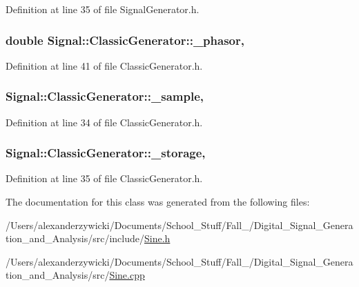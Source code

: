 Definition at line 35 of file Signal\+Generator.\+h.

\hypertarget{classSignal_1_1ClassicGenerator_ade9b66bc49d2d2f40a1390fc6374b8b2}{
\subsubsection[{\+\_\+phasor}]{\setlength{\rightskip}{0pt plus 5cm}double Signal\+::\+Classic\+Generator\+::\+\_\+phasor\hspace{0.3cm}{\ttfamily [protected]}, {\ttfamily [inherited]}}}\label{classSignal_1_1ClassicGenerator_ade9b66bc49d2d2f40a1390fc6374b8b2}


Definition at line 41 of file Classic\+Generator.\+h.

\hypertarget{classSignal_1_1ClassicGenerator_a40313d0d806d6e44af7d41b3ef3a0822}{
\subsubsection[{\+\_\+sample}]{ Signal\+::\+Classic\+Generator\+::\+\_\+sample\hspace{0.3cm}{\ttfamily [protected]}, {\ttfamily [inherited]}}}\label{classSignal_1_1ClassicGenerator_a40313d0d806d6e44af7d41b3ef3a0822}


Definition at line 34 of file Classic\+Generator.\+h.

\hypertarget{classSignal_1_1ClassicGenerator_a1214faf589eccb01631700723900bbf9}{
\subsubsection[{\+\_\+storage}]{ Signal\+::\+Classic\+Generator\+::\+\_\+storage\hspace{0.3cm}{\ttfamily [protected]}, {\ttfamily [inherited]}}}\label{classSignal_1_1ClassicGenerator_a1214faf589eccb01631700723900bbf9}


Definition at line 35 of file Classic\+Generator.\+h.



The documentation for this class was generated from the following files\+:\begin{DoxyCompactItemize}
\item 
/\+Users/alexanderzywicki/\+Documents/\+School\+\_\+\+Stuff/\+Fall\+\_/\+Digital\+\_\+\+Signal\+\_\+\+Generation\+\_\+and\+\_\+\+Analysis/src/include/\hyperlink{Sine_8h}{Sine.\+h}\item 
/\+Users/alexanderzywicki/\+Documents/\+School\+\_\+\+Stuff/\+Fall\+\_/\+Digital\+\_\+\+Signal\+\_\+\+Generation\+\_\+and\+\_\+\+Analysis/src/\hyperlink{Sine_8cpp}{Sine.\+cpp}\end{DoxyCompactItemize}
